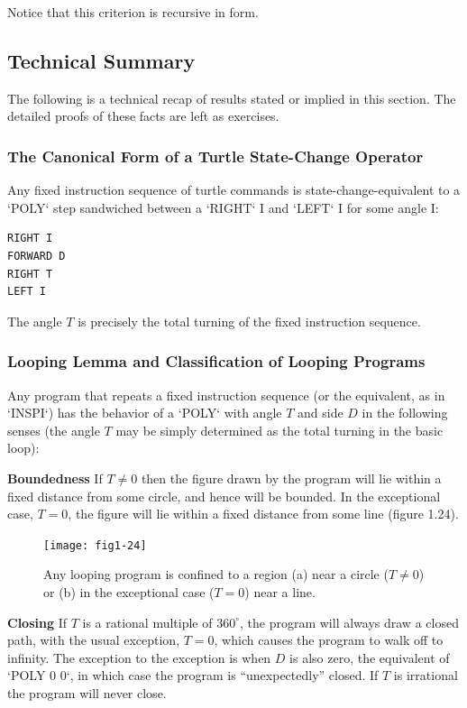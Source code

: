 \documentclass{book}
\begin{document}
Notice that this criterion is recursive in form.

\subsection{Technical Summary}

The following is a technical recap of results stated or implied in this
section. The detailed proofs of these facts are left as exercises.

\subsubsection{The Canonical Form of a Turtle State-Change Operator}

Any fixed instruction sequence of turtle commands is state-change-equivalent to a \textsc{`POLY`} step sandwiched between a \textsc{`RIGHT`} I  and \textsc{`LEFT`} I  for some angle I:

\begin{verbatim}
RIGHT I
FORWARD D
RIGHT T
LEFT I
\end{verbatim}
The angle $T$ is precisely the total turning of the fixed instruction sequence.

\subsubsection{Looping Lemma and Classification of Looping Programs}

Any program that repeats a fixed instruction sequence (or the equivalent,
as in \textsc{`INSPI`}) has the behavior of a \textsc{`POLY`} with angle $T$ and side $D$ in the
following senses (the angle $T$ may be simply determined as the total
turning in the basic loop):

\noindent \textbf{Boundedness} If $T \not= 0$ then the figure drawn by the program will lie
within a fixed distance from some circle, and hence will be bounded. In
the exceptional case, $T = 0$, the figure will lie within a fixed distance
from some line (figure 1.24).

\begin{figure}
\begin{center}
\texttt{[image: fig1-24]}
\caption{Any looping program is confined to a region (a) near a circle ($T \not= 0$) or (b) in the exceptional case ($T = 0$) near a line.}
\end{center}
\end{figure}

\noindent \textbf{Closing} If $T$ is a rational multiple of $360^{\circ}$, the program will always
draw a closed path, with the usual exception, $T = 0$, which causes the
program to walk off to infinity. The exception to the exception is when
$D$ is also zero, the equivalent of \textsc{`POLY 0 0`}, in which case the program is
``unexpectedly'' closed. If $T$ is irrational the program will never close.
\end{document}
